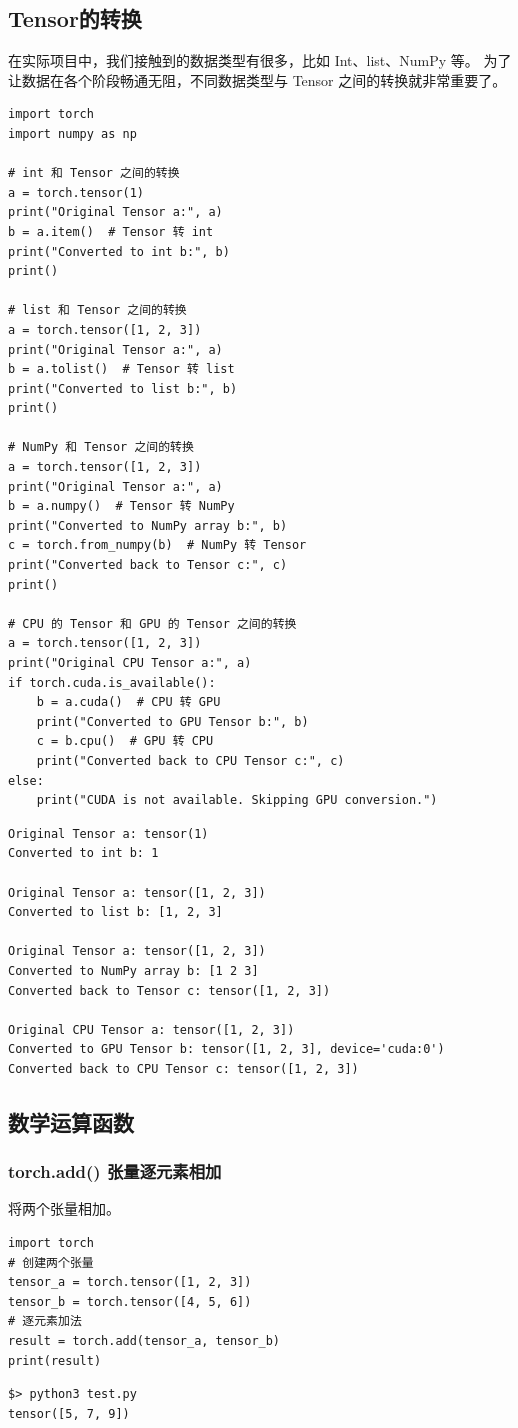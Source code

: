 \subsection{Tensor的转换}
在实际项目中，我们接触到的数据类型有很多，比如 Int、list、NumPy 等。
为了让数据在各个阶段畅通无阻，不同数据类型与 Tensor 之间的转换就非常重要了。
\begin{lstlisting}[style=pythonstyle]
import torch
import numpy as np

# int 和 Tensor 之间的转换
a = torch.tensor(1)
print("Original Tensor a:", a)
b = a.item()  # Tensor 转 int
print("Converted to int b:", b)
print()

# list 和 Tensor 之间的转换
a = torch.tensor([1, 2, 3])
print("Original Tensor a:", a)
b = a.tolist()  # Tensor 转 list
print("Converted to list b:", b)
print()

# NumPy 和 Tensor 之间的转换
a = torch.tensor([1, 2, 3])
print("Original Tensor a:", a)
b = a.numpy()  # Tensor 转 NumPy
print("Converted to NumPy array b:", b)
c = torch.from_numpy(b)  # NumPy 转 Tensor
print("Converted back to Tensor c:", c)
print()

# CPU 的 Tensor 和 GPU 的 Tensor 之间的转换
a = torch.tensor([1, 2, 3])
print("Original CPU Tensor a:", a)
if torch.cuda.is_available():
    b = a.cuda()  # CPU 转 GPU
    print("Converted to GPU Tensor b:", b)
    c = b.cpu()  # GPU 转 CPU
    print("Converted back to CPU Tensor c:", c)
else:
    print("CUDA is not available. Skipping GPU conversion.")
\end{lstlisting}
\begin{lstlisting}[style=demostyle,numbers=none]
Original Tensor a: tensor(1)
Converted to int b: 1

Original Tensor a: tensor([1, 2, 3])
Converted to list b: [1, 2, 3]

Original Tensor a: tensor([1, 2, 3])
Converted to NumPy array b: [1 2 3]
Converted back to Tensor c: tensor([1, 2, 3])

Original CPU Tensor a: tensor([1, 2, 3])
Converted to GPU Tensor b: tensor([1, 2, 3], device='cuda:0')
Converted back to CPU Tensor c: tensor([1, 2, 3])
\end{lstlisting}

\subsection{数学运算函数}
\subsubsection{torch.add() 张量逐元素相加}
将两个张量相加。
\begin{lstlisting}[style=pythonstyle]
import torch
# 创建两个张量
tensor_a = torch.tensor([1, 2, 3])
tensor_b = torch.tensor([4, 5, 6])
# 逐元素加法
result = torch.add(tensor_a, tensor_b)
print(result)
\end{lstlisting}
\begin{lstlisting}[style=demostyle,numbers=none]
$> python3 test.py
tensor([5, 7, 9])
\end{lstlisting}


